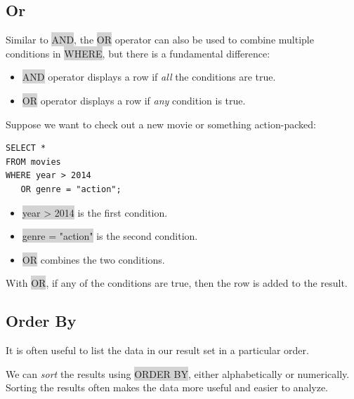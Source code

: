 \documentclass[11pt]{article}
\begin{document}
{{\subsection{Or}
Similar to \colorbox{lightgray}{AND}, the \colorbox{lightgray}{OR} operator can also be used to combine multiple conditions in \colorbox{lightgray}{WHERE}, but there is a fundamental difference:
\begin{itemize}[leftmargin = *]
\item \colorbox{lightgray}{AND} operator displays a row if \textit{all} the conditions are true.
\item \colorbox{lightgray}{OR} operator displays a row if \textit{any} condition is true.
\end{itemize}
Suppose we want to check out a new movie or something action-packed:
\begin{lstlisting}
SELECT *
FROM movies
WHERE year > 2014
   OR genre = "action";
\end{lstlisting}
\begin{itemize}[leftmargin = *]
\item \colorbox{lightgray}{year > 2014} is the first condition.
\item \colorbox{lightgray}{genre = "action"} is the second condition.
\item \colorbox{lightgray}{OR} combines the two conditions. 
\end{itemize}
With \colorbox{lightgray}{OR}, if any of the conditions are true, then the row is added to the result.

\subsection{Order By}
It is often useful to list the data in our result set in a particular order.

We can \textit{sort} the results using \colorbox{lightgray}{ORDER BY}, either alphabetically or numerically. Sorting the results often makes the data more useful and easier to analyze.

}}
\end{document}
